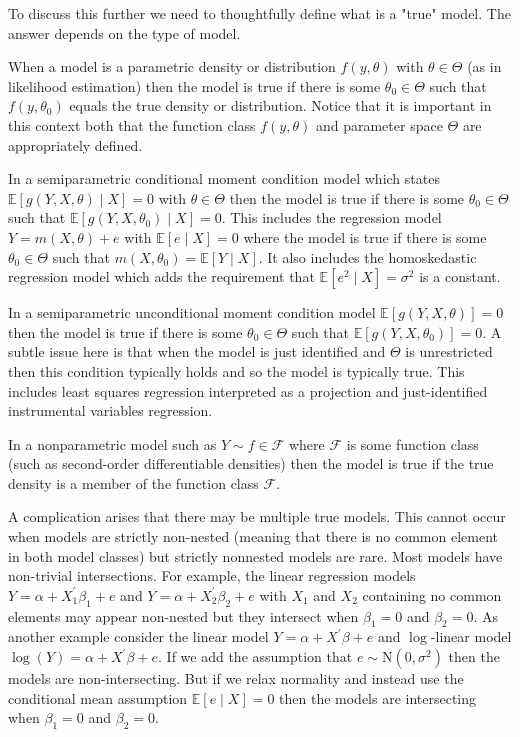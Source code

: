 \documentclass[10pt]{article}
\begin{document}
To discuss this further we need to thoughtfully define what is a "true" model. The answer depends on the type of model.

When a model is a parametric density or distribution $f(y, \theta)$ with $\theta \in \Theta$ (as in likelihood estimation) then the model is true if there is some $\theta_{0} \in \Theta$ such that $f\left(y, \theta_{0}\right)$ equals the true density or distribution. Notice that it is important in this context both that the function class $f(y, \theta)$ and parameter space $\Theta$ are appropriately defined.

In a semiparametric conditional moment condition model which states $\mathbb{E}[g(Y, X, \theta) \mid X]=0$ with $\theta \in \Theta$ then the model is true if there is some $\theta_{0} \in \Theta$ such that $\mathbb{E}\left[g\left(Y, X, \theta_{0}\right) \mid X\right]=0$. This includes the regression model $Y=m(X, \theta)+e$ with $\mathbb{E}[e \mid X]=0$ where the model is true if there is some $\theta_{0} \in \Theta$ such that $m\left(X, \theta_{0}\right)=\mathbb{E}[Y \mid X]$. It also includes the homoskedastic regression model which adds the requirement that $\mathbb{E}\left[e^{2} \mid X\right]=\sigma^{2}$ is a constant.

In a semiparametric unconditional moment condition model $\mathbb{E}[g(Y, X, \theta)]=0$ then the model is true if there is some $\theta_{0} \in \Theta$ such that $\mathbb{E}\left[g\left(Y, X, \theta_{0}\right)\right]=0$. A subtle issue here is that when the model is just identified and $\Theta$ is unrestricted then this condition typically holds and so the model is typically true. This includes least squares regression interpreted as a projection and just-identified instrumental variables regression.

In a nonparametric model such as $Y \sim f \in \mathscr{F}$ where $\mathscr{F}$ is some function class (such as second-order differentiable densities) then the model is true if the true density is a member of the function class $\mathscr{F}$.

A complication arises that there may be multiple true models. This cannot occur when models are strictly non-nested (meaning that there is no common element in both model classes) but strictly nonnested models are rare. Most models have non-trivial intersections. For example, the linear regression models $Y=\alpha+X_{1}^{\prime} \beta_{1}+e$ and $Y=\alpha+X_{2}^{\prime} \beta_{2}+e$ with $X_{1}$ and $X_{2}$ containing no common elements may appear non-nested but they intersect when $\beta_{1}=0$ and $\beta_{2}=0$. As another example consider the linear model $Y=\alpha+X^{\prime} \beta+e$ and $\log$-linear model $\log (Y)=\alpha+X^{\prime} \beta+e$. If we add the assumption that $e \sim \mathrm{N}\left(0, \sigma^{2}\right)$ then the models are non-intersecting. But if we relax normality and instead use the conditional mean assumption $\mathbb{E}[e \mid X]=0$ then the models are intersecting when $\beta_{1}=0$ and $\beta_{2}=0$.
\end{document}
